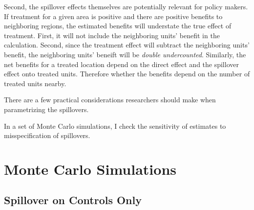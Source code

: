 \documentclass[11pt]{article}
\begin{document}
Second, the spillover effects themselves are potentially relevant for policy makers. If treatment for a given area is positive and there are positive benefits to neighboring regions, the estimated benefits will understate the true effect of treatment. First, it will not include the neighboring units' benefit in the calculation. Second, since the treatment effect will subtract the neighboring units' benefit, the neighboring units' beneift will be \emph{double undercounted}. Similarly, the net benefits for a treated location depend on the direct effect and the spillover effect onto treated units. Therefore whether the benefits depend on the number of treated units nearby.

There are a few practical considerations researchers should make when parametrizing the spillovers. %

In a set of Monte Carlo simulations, I check the sensitivity of estimates to misspecification of spillovers.




\section{Monte Carlo Simulations}

\subsection{Spillover on Controls Only}
\end{document}
